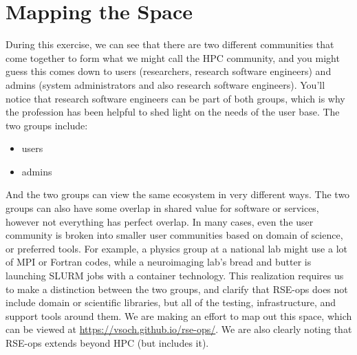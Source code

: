 \section{Mapping the Space}

During this exercise, we can see that there are two different communities that come together to form what we might call the HPC community, and you might guess this comes down to users (researchers, research software engineers) and admins (system administrators and also research software engineers). You'll notice that research software engineers can be part of both groups, which is why the profession has been helpful to shed light on the needs of the user base. The two groups include:

\begin{itemize}
\item users
\item admins
\end{itemize}

And the two groups can view the same ecosystem in very different ways. The two groups can also have some overlap in shared value for software or services, however not everything has perfect overlap. In many cases, even the user community is broken into smaller user communities based on domain of science, or preferred tools. For example, a physics group at a national lab might use a lot of MPI or Fortran codes, while a neuroimaging lab's bread and butter is launching SLURM jobs with a container technology.  This realization requires us to make a distinction between the two groups, and clarify that RSE-ops does not include domain or scientific libraries, but all of the testing, infrastructure, and support tools around them. We are making an effort to map out this space, which can be viewed at \url{https://vsoch.github.io/rse-ops/}. We are also clearly noting that RSE-ops extends beyond HPC (but includes it).
